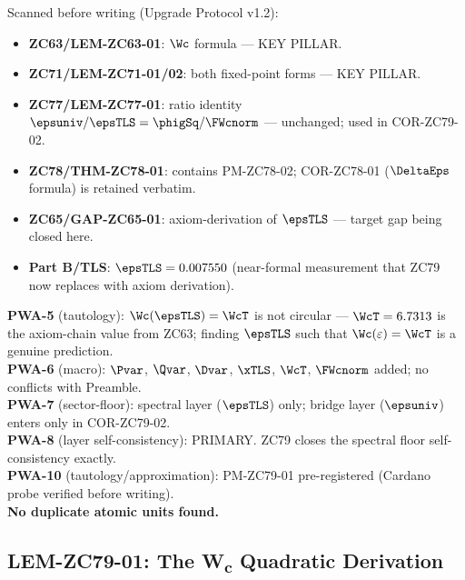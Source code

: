 \documentclass[12pt, a4paper]{article}
\begin{document}
\begin{formalbox}[title={Pre-Work Audit Record --- ZC79}]
Scanned before writing (Upgrade Protocol v1.2):
\begin{itemize}[leftmargin=2em, noitemsep]
  \item \textbf{ZC63/LEM-ZC63-01}: $\Wc$ formula --- KEY PILLAR.
  \item \textbf{ZC71/LEM-ZC71-01/02}: both fixed-point forms --- KEY PILLAR.
  \item \textbf{ZC77/LEM-ZC77-01}: ratio identity $\epsuniv/\epsTLS
    = \phigSq/\FWcnorm$ --- unchanged; used in COR-ZC79-02.
  \item \textbf{ZC78/THM-ZC78-01}: contains PM-ZC78-02;
    COR-ZC78-01 ($\DeltaEps$ formula) is retained verbatim.
  \item \textbf{ZC65/GAP-ZC65-01}: axiom-derivation of $\epsTLS$ ---
    target gap being closed here.
  \item \textbf{Part B/TLS}: $\epsTLS = 0.007550$ (near-formal measurement
    that ZC79 now replaces with axiom derivation).
\end{itemize}

\textbf{PWA-5} (tautology): $\Wc(\epsTLS) = \WcT$ is not circular ---
$\WcT = 6.7313$ is the axiom-chain value from ZC63; finding $\epsTLS$
such that $\Wc(\varepsilon) = \WcT$ is a genuine prediction.\\
\textbf{PWA-6} (macro): $\Pvar$, $\Qvar$, $\Dvar$, $\xTLS$,
$\WcT$, $\FWcnorm$ added; no conflicts with Preamble.\\
\textbf{PWA-7} (sector-floor): spectral layer ($\epsTLS$) only;
bridge layer ($\epsuniv$) enters only in COR-ZC79-02.\\
\textbf{PWA-8} (layer self-consistency): PRIMARY. ZC79 closes the
spectral floor self-consistency exactly.\\
\textbf{PWA-10} (tautology/approximation): PM-ZC79-01 pre-registered
(Cardano probe verified before writing).\\
\textbf{No duplicate atomic units found.}
\end{formalbox}

\subsection{LEM-ZC79-01: The W\textsubscript{c} Quadratic Derivation}
\label{sec:lem}

\end{document}
